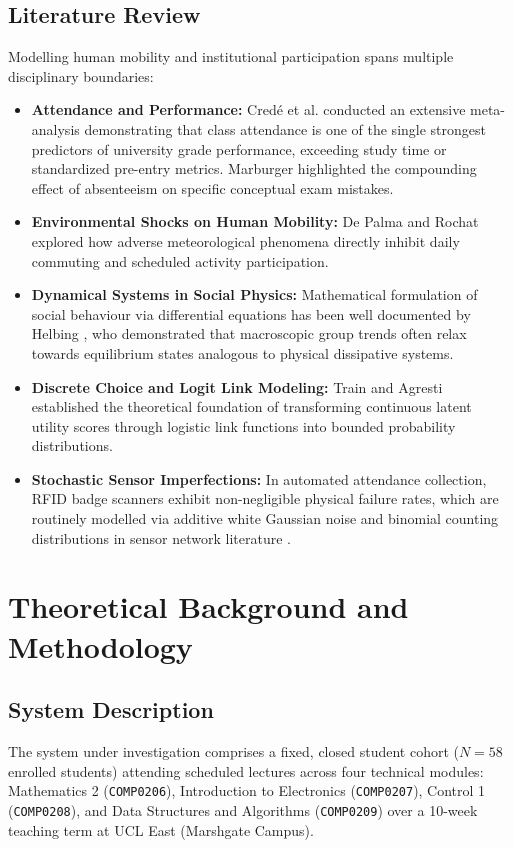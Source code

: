 \documentclass{article}
\begin{document}
\subsection{Literature Review}
Modelling human mobility and institutional participation spans multiple disciplinary boundaries:
\begin{itemize}
    \item \textbf{Attendance and Performance:} Cred{\'e} et al. \cite{crede2010} conducted an extensive meta-analysis demonstrating that class attendance is one of the single strongest predictors of university grade performance, exceeding study time or standardized pre-entry metrics. Marburger \cite{marburger2006} highlighted the compounding effect of absenteeism on specific conceptual exam mistakes.
    \item \textbf{Environmental Shocks on Human Mobility:} De Palma and Rochat \cite{depalma1999} explored how adverse meteorological phenomena directly inhibit daily commuting and scheduled activity participation.
    \item \textbf{Dynamical Systems in Social Physics:} Mathematical formulation of social behaviour via differential equations has been well documented by Helbing \cite{helbing2001}, who demonstrated that macroscopic group trends often relax towards equilibrium states analogous to physical dissipative systems.
    \item \textbf{Discrete Choice and Logit Link Modeling:} Train \cite{train2009} and Agresti \cite{agresti2002} established the theoretical foundation of transforming continuous latent utility scores through logistic link functions into bounded probability distributions.
    \item \textbf{Stochastic Sensor Imperfections:} In automated attendance collection, RFID badge scanners exhibit non-negligible physical failure rates, which are routinely modelled via additive white Gaussian noise and binomial counting distributions in sensor network literature \cite{birglen2018}.
\end{itemize}


\section{Theoretical Background and Methodology}

\subsection{System Description}
The system under investigation comprises a fixed, closed student cohort ($N = 58$ enrolled students) attending scheduled lectures across four technical modules: Mathematics 2 (\texttt{COMP0206}), Introduction to Electronics (\texttt{COMP0207}), Control 1 (\texttt{COMP0208}), and Data Structures and Algorithms (\texttt{COMP0209}) over a 10-week teaching term at UCL East (Marshgate Campus).
\end{document}
